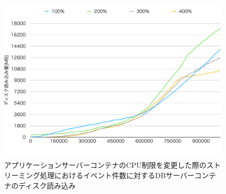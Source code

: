 \documentclass[../../../../../main]{subfiles}
\begin{document}
    \begin{figure}[H]
        \centering
        \includegraphics[width=12cm]{graph}
        \caption{アプリケーションサーバーコンテナのCPU制限を変更した際のストリーミング処理におけるイベント件数に対するDBサーバーコンテナのディスク読み込み}
        \label{fig:stream-change-app-cpu-limit-db-disk-out-app_1024-db_1_1024}
    \end{figure}
\end{document}
